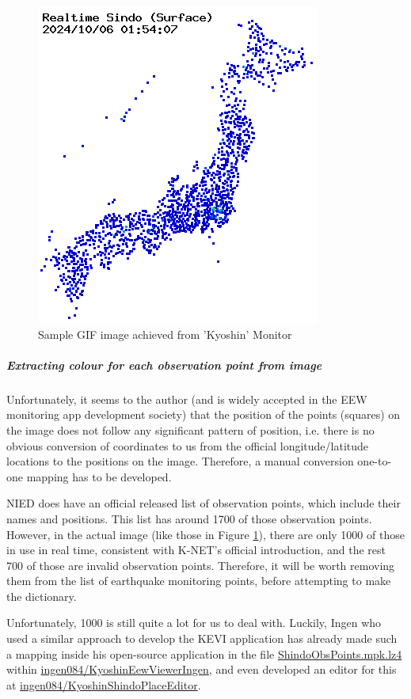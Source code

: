 \documentclass[10pt]{article}
\newcommand{\GitHubHref}[2]{\href{https://github.com/#1/#2}{\faGithub\space #1/#2}}
\begin{document}
\begin{figure}[!ht]
    \centering
    \includegraphics[width = 0.5\linewidth]{sample-kmoni.png}
    \caption{Sample GIF image achieved from 'Kyoshin' Monitor}
    \label{fig:sample-kmoni}
\end{figure}

\subparagraph{Extracting colour for each observation point from image}

Unfortunately, it seems to the author (and is widely accepted in the EEW monitoring app development society) that the position of the points (squares) on the image does not follow any significant pattern of position, i.e. there is no obvious conversion of coordinates to us from the official longitude/latitude locations to the positions on the image. Therefore, a manual conversion one-to-one mapping has to be developed.

NIED does have an official released list of observation points, which include their names and positions. This list has around 1700 of those observation points. However, in the actual image (like those in Figure \ref{fig:sample-kmoni}), there are only 1000 of those in use in real time, consistent with K-NET's official introduction, and the rest 700 of those are invalid observation points. Therefore, it will be worth removing them from the list of earthquake monitoring points, before attempting to make the dictionary.

Unfortunately, 1000 is still quite a lot for us to deal with. Luckily, Ingen who used a similar approach to develop the KEVI application has already made such a mapping inside his open-source application in the file \href{https://github.com/ingen084/KyoshinEewViewerIngen/blob/develop/src/KyoshinEewViewer/Assets/ShindoObsPoints.mpk.lz4}{ShindoObsPoints.mpk.lz4} within \GitHubHref{ingen084}{KyoshinEewViewerIngen}, and even developed an editor for this at \GitHubHref{ingen084}{KyoshinShindoPlaceEditor}.
\end{document}
